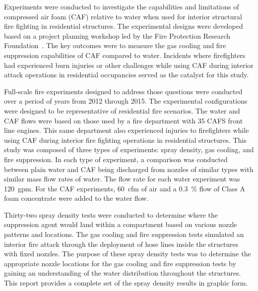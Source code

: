 \documentclass[12pt,oneside]{book}
\begin{document}
Experiments were conducted to investigate the capabilities and limitations of compressed air foam (CAF) relative to water when used for interior structural fire fighting in residential structures. The experimental designs were developed based on a project planning workshop led by the Fire Protection Research Foundation~\cite{Grant:2011}. The key outcomes were to measure the gas cooling and fire suppression capabilities of CAF compared to water. Incidents where firefighters had experienced burn injuries or other challenges while using CAF during interior attack operations in residential occupancies served as the catalyst for this study.

Full-scale fire experiments designed to address those questions were conducted over a period of years from 2012 through 2015. The experimental configurations were designed to be representative of residential fire scenarios. The water and CAF flows were based on those used by a fire department with 35 CAFS front line engines. This same department also experienced injuries to firefighters while using CAF during interior fire fighting operations in residential structures. This study was composed of three types of experiments: spray density, gas cooling, and fire suppression. In each type of experiment, a comparison was conducted between plain water and CAF being discharged from nozzles of similar types with similar mass flow rates of water. The flow rate for each water experiment was 120~gpm. For the CAF experiments, 60~cfm of air and a 0.3~\% flow of Class A foam concentrate were added to the water flow.

Thirty-two spray density tests were conducted to determine where the suppression agent would land within a compartment based on various nozzle patterns and locations. The gas cooling and fire suppression tests simulated an interior fire attack through the deployment of hose lines inside the structures with fixed nozzles. The purpose of these spray density tests was to determine the appropriate nozzle locations for the gas cooling and fire suppression tests by gaining an understanding of the water distribution throughout the structures. This report provides a complete set of the spray density results in graphic form.
\end{document}

